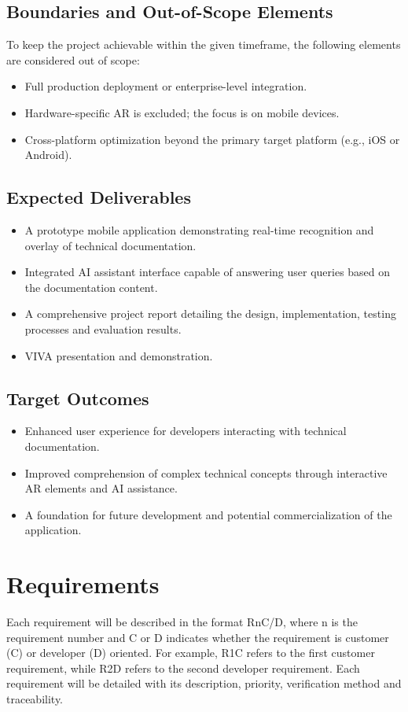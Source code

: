 \documentclass[12pt]{article}
\begin{document}
    \subsection{Boundaries and Out-of-Scope Elements}
    To keep the project achievable within the given timeframe, the following elements are considered out of scope:
    \begin{itemize}
        \item Full production deployment or enterprise-level integration.
        \item Hardware-specific AR is excluded; the focus is on mobile devices.
        \item Cross-platform optimization beyond the primary target platform (e.g., iOS or Android).
    \end{itemize}

    \subsection{Expected Deliverables}
    \begin{itemize}
        \item A prototype mobile application demonstrating real-time recognition and overlay of technical documentation.
        \item Integrated AI assistant interface capable of answering user queries based on the documentation content.
        \item A comprehensive project report detailing the design, implementation, testing processes and evaluation results.
        \item VIVA presentation and demonstration.
    \end{itemize}

    \subsection{Target Outcomes}
    \begin{itemize}
        \item Enhanced user experience for developers interacting with technical documentation.
        \item Improved comprehension of complex technical concepts through interactive AR elements and AI assistance.
        \item A foundation for future development and potential commercialization of the application.
    \end{itemize}

\section{Requirements}
Each requirement will be described in the format R{n}C/D, where n is the requirement number and C or D indicates whether the requirement is customer (C) or developer (D) oriented. For example,
R1C refers to the first customer requirement, while R2D refers to the second developer requirement. Each requirement will be detailed with its description, priority, verification method and traceability.
\end{document}
